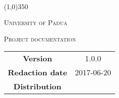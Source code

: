 \documentclass[a4paper,12pt]{article}
\date{2017-05-10}
\begin{document}
	\begin{titlepage}
		\centering
		{\huge\bfseries \nomeprogetto\par}
		\sottotitolo \\
		\line(1,0){350} \\
		{\scshape\LARGE University of Padua \par}
		\vspace{1cm}
		{\scshape\Large Project documentation \par}
		\logo
		\newpage
		\begin{tabular}{c|c}
			{\hfill\textbf{Version}} 				& 1.0.0 \\ 
			{\hfill\textbf{Redaction date}} 		& 2017-06-20 \\ 
			{\hfill\textbf{Distribution}} 		& \abujari \\
		\end{tabular}
	\end{titlepage}
	
	\pagestyle{myfront}
	\newpage
	\tableofcontents
	\newpage
	\listoffigures
	
	\label{LastFrontPage}	
	\newpage	
	\pagestyle{mymain}
				
	\newpage	
		
	\newpage	
			
	\newpage	
		
		
	\label{LastPage}
\end{document}
